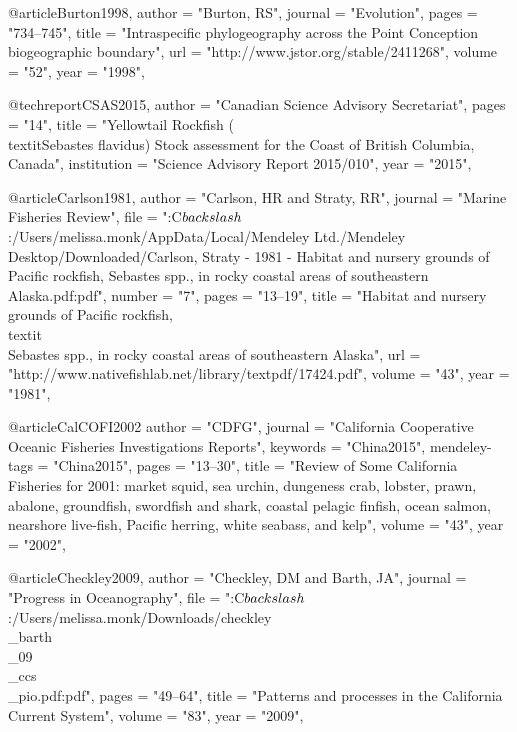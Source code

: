 @article{Burton1998,
    author = "{Burton, RS}",
    journal = "{Evolution}",
    pages = "{734--745}",
    title = "{{Intraspecific phylogeography across the Point Conception biogeographic boundary}}",
    url = "{http://www.jstor.org/stable/2411268}",
    volume = "{52}",
    year = "{1998}",
}

@techreport{CSAS2015,
    author = "{{Canadian Science Advisory Secretariat}}",
    pages = "{14}",
    title = "{{Yellowtail Rockfish (\\textit{{Sebastes} flavidus}) Stock assessment for the Coast of British Columbia, Canada}}",
    institution = "{{Science Advisory Report 2015/010}}",
    year = "{2015}",
}

@article{Carlson1981,
    author = "{Carlson, HR and Straty, RR}",
    journal = "{Marine Fisheries Review}",
    file = "{:C$\\backslash$:/Users/melissa.monk/AppData/Local/Mendeley Ltd./Mendeley Desktop/Downloaded/Carlson, Straty - 1981 - Habitat and nursery grounds of Pacific rockfish, Sebastes spp., in rocky coastal areas of southeastern Alaska.pdf:pdf}",
    number = "{7}",
    pages = "{13--19}",
    title = "{{Habitat and nursery grounds of Pacific rockfish, \\textit\\{{Sebastes}} spp., in rocky coastal areas of southeastern Alaska}}",
    url = "{http://www.nativefishlab.net/library/textpdf/17424.pdf}",
    volume = "{43}",
    year = "{1981}",
}

@article{CalCOFI2002
    author = "{CDFG}",
    journal = "{California Cooperative Oceanic Fisheries Investigations Reports}",
    keywords = "{China2015}",
    mendeley-tags = "{China2015}",
    pages = "{13--30}",
    title = "{{Review of Some California Fisheries for 2001: market squid, sea urchin, dungeness crab, lobster, prawn, abalone, groundfish, swordfish and shark, coastal pelagic finfish, ocean salmon, nearshore live-fish, Pacific herring, white seabass, and kelp}}",
    volume = "{43}",
    year = "{2002}",
}

@article{Checkley2009,
    author = "{Checkley, DM and Barth, JA}",
    journal = "{Progress in Oceanography}",
    file = "{:C$\\backslash$:/Users/melissa.monk/Downloads/checkley\\_barth\\_09\\_ccs\\_pio.pdf:pdf}",
    pages = "{49--64}",
    title = "{{Patterns and processes in the California Current System}}",
    volume = "{83}",
    year = "{2009}",
}

